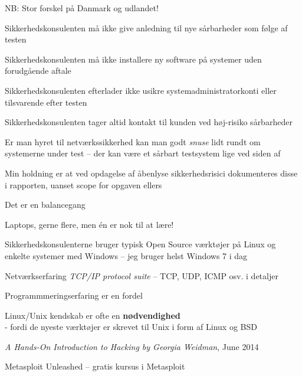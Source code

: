 \documentclass[Screen16to9,17pt]{foils}
\begin{document}
\begin{list2}
\item NB: Stor forskel på Danmark og udlandet!
\item Sikkerhedskonsulenten må ikke give anledning til nye sårbarheder
  som følge af testen
\item Sikkerhedskonsulenten må ikke installere ny software på
  systemer uden forudgående aftale
\item Sikkerhedskonsulenten efterlader ikke usikre
  systemadministratorkonti eller tilsvarende efter testen
\item Sikkerhedskonsulenten tager altid kontakt til kunden ved
  høj-risiko sårbarheder
\item Er man hyret til netværkssikkerhed kan man godt \emph{snuse}
  lidt rundt om systemerne under test -- der kan være et sårbart
  testsystem lige ved siden af
\item Min holdning er at ved opdagelse af åbenlyse sikkerhedsrisici
  dokumenteres disse i rapporten, uanset scope for opgaven ellers
\end{list2}

\centerline{Det er en balancegang}




\begin{list1}

\item Laptops, gerne flere, men én er nok til at lære!
\begin{list2}
\item Sikkerhedskonsulenterne bruger typisk Open Source værktøjer på Linux og
enkelte systemer med Windows -- jeg bruger helst Windows 7 i dag
\item Netværkserfaring \emph{TCP/IP protocol suite} -- TCP, UDP, ICMP osv. i detaljer
\item Programmmeringserfaring er en fordel
\item Linux/Unix kendskab er ofte en {\bfseries nødvendighed}\\
- fordi de nyeste værktøjer er skrevet til Unix i form af Linux og BSD
\item \emph{A Hands-On Introduction to Hacking
by Georgia Weidman}, June 2014\\
\item Metasploit Unleashed -- gratis kursus i Metasploit\\
\end{list2}
\end{list1}
\end{document}
